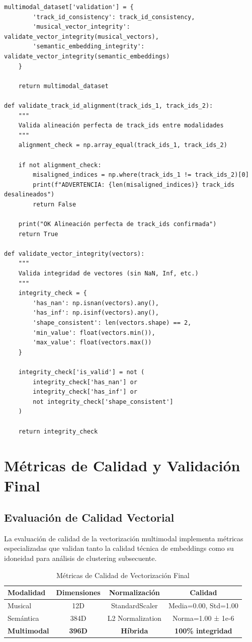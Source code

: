 \documentclass[12pt,a4paper]{report}
\begin{document}
\begin{lstlisting}[caption={Integración de Vectores Musicales y Semánticos}]
    multimodal_dataset['validation'] = {
        'track_id_consistency': track_id_consistency,
        'musical_vector_integrity': validate_vector_integrity(musical_vectors),
        'semantic_embedding_integrity': validate_vector_integrity(semantic_embeddings)
    }

    return multimodal_dataset

def validate_track_id_alignment(track_ids_1, track_ids_2):
    """
    Valida alineación perfecta de track_ids entre modalidades
    """
    alignment_check = np.array_equal(track_ids_1, track_ids_2)

    if not alignment_check:
        misaligned_indices = np.where(track_ids_1 != track_ids_2)[0]
        print(f"ADVERTENCIA: {len(misaligned_indices)} track_ids desalineados")
        return False

    print("OK Alineación perfecta de track_ids confirmada")
    return True

def validate_vector_integrity(vectors):
    """
    Valida integridad de vectores (sin NaN, Inf, etc.)
    """
    integrity_check = {
        'has_nan': np.isnan(vectors).any(),
        'has_inf': np.isinf(vectors).any(),
        'shape_consistent': len(vectors.shape) == 2,
        'min_value': float(vectors.min()),
        'max_value': float(vectors.max())
    }

    integrity_check['is_valid'] = not (
        integrity_check['has_nan'] or
        integrity_check['has_inf'] or
        not integrity_check['shape_consistent']
    )

    return integrity_check
\end{lstlisting}

\section{Métricas de Calidad y Validación Final}

\subsection{Evaluación de Calidad Vectorial}

La evaluación de calidad de la vectorización multimodal implementa métricas especializadas que validan tanto la calidad técnica de embeddings como su idoneidad para análisis de clustering subsecuente.

\begin{table}[H]
\centering
\caption{Métricas de Calidad de Vectorización Final}
\begin{tabular}{|l|c|c|c|}
\hline
\textbf{Modalidad} & \textbf{Dimensiones} & \textbf{Normalización} & \textbf{Calidad} \\
\hline
Musical & 12D & StandardScaler & Media=0.00, Std=1.00 \\
\hline
Semántica & 384D & L2 Normalization & Norma=1.00 ± 1e-6 \\
\hline
\textbf{Multimodal} & \textbf{396D} & \textbf{Híbrida} & \textbf{100\% integridad} \\
\hline
\end{tabular}
\end{table}
\end{document}
